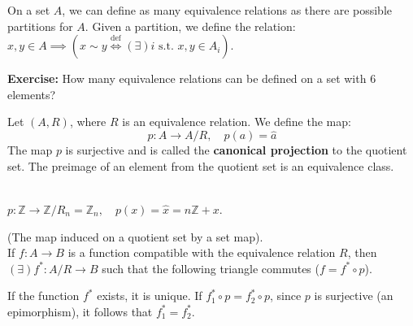 On a set $A$, we can define as many equivalence relations as there are possible partitions for $A$.
Given a partition, we define the relation: $x, y \in A \implies \left( x \sim y \overset{\text{def}}{\iff} (\exists) i \text{ s.t. } x, y \in A_i \right)$.

\textbf{Exercise:} How many equivalence relations can be defined on a set with 6 elements? 

\begin{definition}
Let $(A, R)$, where $R$ is an equivalence relation. We define the map:
$$ p : A \rightarrow A/R, \quad p(a) = \hat{a} $$
The map $p$ is surjective and is called the \textbf{canonical projection} to the quotient set. The preimage of an element from the quotient set is an equivalence class.
\end{definition}


\begin{example}\mbox{}\\
$p: \mathbb{Z} \rightarrow \mathbb{Z}/R_n = \mathbb{Z}_n, \quad p(x) = \hat{x} = n\mathbb{Z} + x$.
\end{example}


\begin{theorem}
(The map induced on a quotient set by a set map). \\
If $f: A \rightarrow B$ is a function compatible with the equivalence relation $R$, then $(\exists) f^* : A/R \rightarrow B$ such that the following triangle commutes ($f = f^* \circ p$).

\begin{center}
\hspace{2cm}
\end{center}
\end{theorem}

\begin{remark}
If the function $f^*$ exists, it is unique. If $f_1^* \circ p = f_2^* \circ p$, since $p$ is surjective (an epimorphism), it follows that $f_1^* = f_2^*$.
\end{remark}


